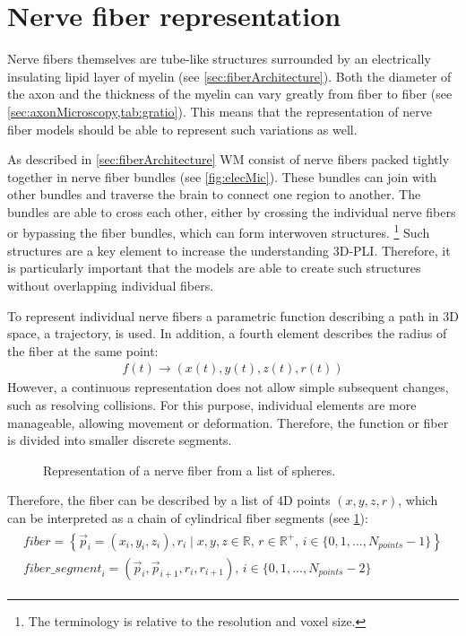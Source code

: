 \section{Nerve fiber representation}
\label{sec:nerve_fiber_representation}
%
Nerve fibers themselves are tube-like structures surrounded by an electrically insulating lipid layer of myelin (see \cref{sec:fiberArchitecture}).
Both the diameter of the axon and the thickness of the myelin can vary greatly from fiber to fiber (see \cref{sec:axonMicroscopy,tab:gratio}).
This means that the representation of nerve fiber models should be able to represent such variations as well.
\par
%
As described in \cref{sec:fiberArchitecture} \ac{WM} consist of nerve fibers packed tightly together in nerve fiber bundles (see \cref{fig:elecMic}).
These bundles can join with other bundles and traverse the brain to connect one region to another.
The bundles are able to cross each other, either by crossing the individual nerve fibers or bypassing the fiber bundles, which can form interwoven structures.
\footnote{The terminology  is relative to the resolution and voxel size.}
Such structures are a key element to increase the understanding \ac{3D-PLI}.
Therefore, it is particularly important that the models are able to create such structures without overlapping individual fibers.
\par
%
To represent individual nerve fibers a parametric function describing a path in 3D space, \ie{} a trajectory, is used.
In addition, a fourth element describes the radius of the fiber at the same point:
% 
\begin{align}
f(t) \rightarrow (x(t),y(t), z(t), r(t))
\end{align}
% 
However, a continuous representation does not allow simple subsequent changes, such as resolving collisions.
For this purpose, individual elements are more manageable, allowing movement or deformation.
Therefore, the function or fiber is divided into smaller discrete segments.
%
\begin{figure}[!t]
    \setlength{\tikzwidth}{0.85\textwidth}
    \centering
	\caption[]{Representation of a nerve fiber from a list of spheres.}
	\label{fig:fiberReb}
\end{figure}
%
Therefore, the fiber can be described by a list of 4D points $(x,y,z,r)$, which can be interpreted as a chain of cylindrical fiber segments (see \cref{fig:fiberReb}):
\begin{align}
\begin{gathered}
\mathit{fiber} = \left\{ \vec{p}_i=(x_i,y_i,z_i), r_i \mid x,y,z \in \mathbb{R}, \, r \in \mathbb{R^+}, \, i \in \{0,1,...,N_{\mathit{points}}-1\}\right\} \\
\mathit{fiber\_segment}_i = (\vec{p}_i, \vec{p}_{i+1}, r_i, r_{i+1}), \, i \in \{0,1,...,N_{\mathit{points}}-2\}
\end{gathered}
\end{align}
